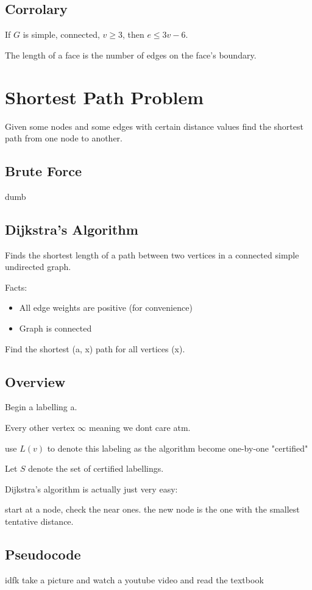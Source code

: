 \documentclass{report}
\begin{document}
\section{Corrolary}
If $G$ is simple, connected, $v \geq 3$, then $e \leq 3v - 6$.


The length of a face is the number of edges on the face's boundary.




\chapter{Shortest Path Problem}
Given some nodes and some edges with certain distance values find the shortest path from one node to another.

\section{Brute Force}
dumb

\section{Dijkstra's Algorithm}
Finds the shortest length of a path between two vertices in a connected simple undirected graph.

Facts:
\begin{itemize}
\item
All edge weights are positive (for convenience)
\item
Graph is connected 
\end{itemize}

Find the shortest (a, x) path for all vertices (x).

\section{Overview}
Begin a labelling a. 

Every other vertex $\infty$ meaning we dont care atm.

use $L(v)$ to denote this labeling as the algorithm become one-by-one "certified"

Let $S$ denote the set of certified labellings.

Dijkstra's algorithm is actually just very easy:

start at a node, check the near ones. the new node is the one with the smallest tentative distance.

\section{Pseudocode}
idfk take a picture and watch a youtube video and read the textbook 
\end{document}
